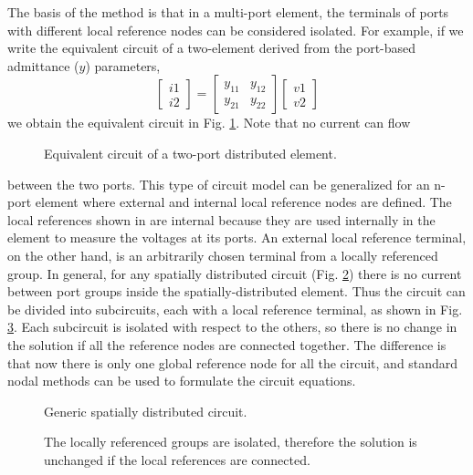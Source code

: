 The basis of the method is that in a multi-port element, the terminals
of ports with different local reference nodes can be considered
isolated.  For example, if we write the equivalent circuit of a
two-element derived from the port-based admittance ($y$) parameters,
\[
  \left[ \begin{array}{c}
    i1 \\
    i2 \end{array} \right] =
 \left[ \begin{array}{cc}
    y_{11} & y_{12} \\
    y_{21} & y_{22}
  \end{array} \right]
  \left[ \begin{array}{c}
    v1 \\
    v2 \end{array} \right]
\]
we obtain the equivalent circuit in Fig. \ref{fig:2_port_y}. Note that
no current can flow
%
\begin{figure}[htpb]
\centerline{\epsfxsize=2.5in }
\caption{Equivalent circuit of a two-port distributed element.}
\label{fig:2_port_y}
\end{figure}
%
between the two ports. This type of circuit model can be generalized
for an n-port element where external and internal local reference
nodes are defined. The local references shown in are internal because
they are used internally in the element to measure the voltages at its
ports. An external local reference terminal, on the other hand, is an
arbitrarily chosen terminal from a locally referenced group. In
general, for any spatially distributed circuit
(Fig. \ref{fig:port_node_2}) there is no current between port groups
inside the spatially-distributed element. Thus the circuit can be
divided into subcircuits, each with a local reference terminal, as
shown in Fig. \ref{fig:potatoes}. Each subcircuit is isolated with
respect to the others, so there is no change in the solution if all
the reference nodes are connected together. The difference is that now
there is only one global reference node for all the circuit, and
standard nodal methods can be used to formulate the circuit equations.
%
\begin{figure}[htpb]
\centerline{\epsfxsize=2.5in }
\caption{Generic spatially distributed circuit.} \label{fig:port_node_2}
\end{figure}
%
%
\begin{figure}[htpb]
\centerline{ }
\caption{The locally referenced groups are isolated,
therefore the solution is unchanged if the local references
are connected.} \label{fig:potatoes}
\end{figure}
